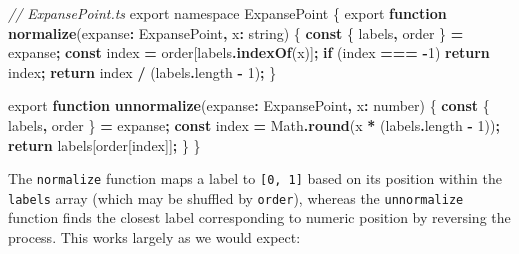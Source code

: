 \documentclass[
  openany]{book}
\newenvironment{Shaded}{\begin{snugshade}}{\end{snugshade}}
\newcommand{\AttributeTok}[1]{\textcolor[rgb]{0.13,0.29,0.53}{#1}}
\newcommand{\BuiltInTok}[1]{#1}
\newcommand{\CommentTok}[1]{\textcolor[rgb]{0.56,0.35,0.01}{\textit{#1}}}
\newcommand{\ControlFlowTok}[1]{\textcolor[rgb]{0.13,0.29,0.53}{\textbf{#1}}}
\newcommand{\DataTypeTok}[1]{\textcolor[rgb]{0.13,0.29,0.53}{#1}}
\newcommand{\DecValTok}[1]{\textcolor[rgb]{0.00,0.00,0.81}{#1}}
\newcommand{\FunctionTok}[1]{\textcolor[rgb]{0.13,0.29,0.53}{\textbf{#1}}}
\newcommand{\ImportTok}[1]{#1}
\newcommand{\KeywordTok}[1]{\textcolor[rgb]{0.13,0.29,0.53}{\textbf{#1}}}
\newcommand{\NormalTok}[1]{#1}
\newcommand{\OperatorTok}[1]{\textcolor[rgb]{0.81,0.36,0.00}{\textbf{#1}}}
\theoremstyle{definition}
\theoremstyle{definition}
\theoremstyle{definition}
\theoremstyle{definition}
\theoremstyle{remark}
\begin{document}
\begin{Shaded}
\begin{Highlighting}[]
\CommentTok{// ExpansePoint.ts}
\ImportTok{export} \ImportTok{namespace} \DataTypeTok{ExpansePoint}\NormalTok{ \{}
  \ImportTok{export} \KeywordTok{function} \FunctionTok{normalize}\NormalTok{(expanse}\OperatorTok{:}\NormalTok{ ExpansePoint}\OperatorTok{,}\NormalTok{ x}\OperatorTok{:} \DataTypeTok{string}\NormalTok{) \{}
    \KeywordTok{const}\NormalTok{ \{ labels}\OperatorTok{,}\NormalTok{ order \} }\OperatorTok{=}\NormalTok{ expanse}\OperatorTok{;}
    \KeywordTok{const}\NormalTok{ index }\OperatorTok{=}\NormalTok{ order[labels}\OperatorTok{.}\FunctionTok{indexOf}\NormalTok{(x)]}\OperatorTok{;}
    \ControlFlowTok{if}\NormalTok{ (index }\OperatorTok{===} \OperatorTok{{-}}\DecValTok{1}\NormalTok{) }\ControlFlowTok{return}\NormalTok{ index}\OperatorTok{;}
    \ControlFlowTok{return}\NormalTok{ index }\OperatorTok{/}\NormalTok{ (labels}\OperatorTok{.}\AttributeTok{length} \OperatorTok{{-}} \DecValTok{1}\NormalTok{)}\OperatorTok{;}
\NormalTok{  \}}

  \ImportTok{export} \KeywordTok{function} \FunctionTok{unnormalize}\NormalTok{(expanse}\OperatorTok{:}\NormalTok{ ExpansePoint}\OperatorTok{,}\NormalTok{ x}\OperatorTok{:} \DataTypeTok{number}\NormalTok{) \{}
    \KeywordTok{const}\NormalTok{ \{ labels}\OperatorTok{,}\NormalTok{ order \} }\OperatorTok{=}\NormalTok{ expanse}\OperatorTok{;}
    \KeywordTok{const}\NormalTok{ index }\OperatorTok{=} \BuiltInTok{Math}\OperatorTok{.}\FunctionTok{round}\NormalTok{(x }\OperatorTok{*}\NormalTok{ (labels}\OperatorTok{.}\AttributeTok{length} \OperatorTok{{-}} \DecValTok{1}\NormalTok{))}\OperatorTok{;}
    \ControlFlowTok{return}\NormalTok{ labels[order[index]]}\OperatorTok{;}
\NormalTok{  \}}
\NormalTok{\}}
\end{Highlighting}
\end{Shaded}

The \texttt{normalize} function maps a label to \texttt{{[}0,\ 1{]}} based on its position within the \texttt{labels} array (which may be shuffled by \texttt{order}), whereas the \texttt{unnormalize} function finds the closest label corresponding to numeric position by reversing the process. This works largely as we would expect:
\end{document}
